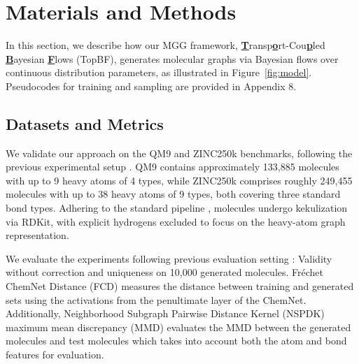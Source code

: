 \documentclass[journal,twoside,web]{ieeecolor}
\begin{document}
\section{Materials and Methods} %

In this section, we describe how our MGG framework, \underline{\textbf{T}}ransp\underline{\textbf{o}}rt-Cou\underline{\textbf{p}}led \underline{\textbf{B}}ayesian \underline{\textbf{F}}lows (TopBF), generates molecular graphs via Bayesian flows over continuous distribution parameters, as illustrated in Figure~\ref{fig:model}. Pseudocodes for training and sampling are provided in Appendix 8. %

\subsection{Datasets and Metrics} 

We validate our approach on the QM9 \cite{ramakrishnan2014quantum} and ZINC250k \cite{irwin2012zinc} benchmarks, following the previous experimental setup \cite{jo2022score}. QM9 contains approximately 133,885 molecules with up to 9 heavy atoms of 4 types, while ZINC250k comprises roughly 249,455 molecules with up to 38 heavy atoms of 9 types, both covering three standard bond types. Adhering to the standard pipeline \cite{luo2021graphdf,jo2022score}, molecules undergo kekulization via RDKit, with explicit hydrogens excluded to focus on the heavy-atom graph representation.

We evaluate the experiments following previous evaluation setting \cite{jo2022score}: Validity without correction and uniqueness on 10,000 generated molecules. Fréchet ChemNet Distance (FCD) \cite{preuer2018frechet} measures the distance between training and generated sets using the activations from the penultimate layer of the ChemNet. Additionally, Neighborhood Subgraph Pairwise Distance Kernel (NSPDK) maximum mean discrepancy (MMD) \cite{costa2010fast} evaluates the MMD between the generated molecules and test molecules which takes into account both the atom and bond features for evaluation.



\end{document}

